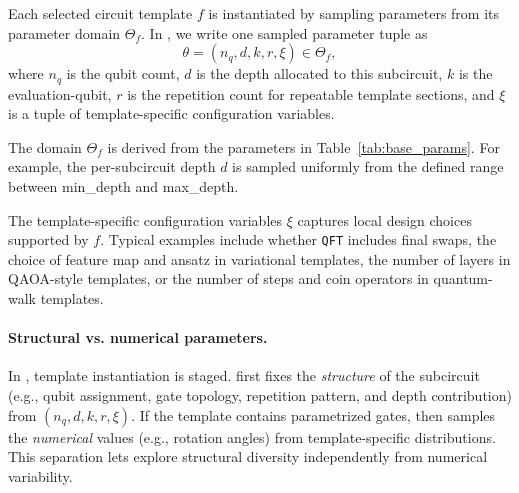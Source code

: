 \begin{appendices}




Each selected circuit template \(f\) is instantiated by sampling parameters from its
parameter domain \(\Theta_f\). In \sys, we write one sampled
parameter tuple as
\begin{equation}
\theta = (n_q, d, k, r, \xi) \in \Theta_f,
\end{equation}
where \(n_q\) is the qubit count, \(d\) is the depth  allocated to this subcircuit,
\(k\) is the evaluation-qubit, \(r\) is the repetition count for repeatable template
sections, and \(\xi\) is a tuple of template-specific configuration variables.

The domain \(\Theta_f\) is derived from the  parameters  in Table~\ref{tab:base_params}. For example, the per-subcircuit depth \(d\) is sampled uniformly from the defined range between  min\_depth and max\_depth.

The template-specific
configuration variables \(\xi\) captures local design choices supported by \(f\).
Typical examples include whether \texttt{QFT} includes final swaps, the choice of feature map
and ansatz in variational templates, the number of layers in QAOA-style templates, or the
number of steps and coin operators in quantum-walk templates.



\paragraph{Structural vs. numerical parameters.}
In \sys, template instantiation is staged. \sys first fixes the \emph{structure} of the subcircuit
(e.g., qubit assignment, gate topology, repetition pattern, and depth contribution) from
\((n_q,d,k,r,\xi)\). If the template contains parametrized gates,  \sys then samples the
\emph{numerical} values (e.g., rotation angles) from template-specific distributions. This
separation lets \sys explore structural diversity independently from numerical variability.




\end{appendices}
